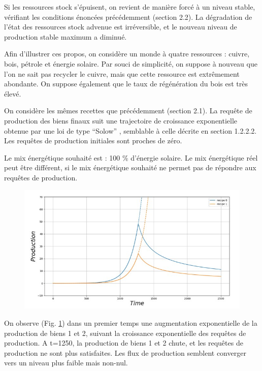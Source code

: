 \documentclass[12pt,a4paper]{article}%
\begin{document}
Si les ressources stock s'épuisent, on revient de manière forcé à un
niveau stable, vérifiant les conditions énoncées précédemment (section 2.2).
La dégradation de l'état des ressources stock advenue est irréversible, et le
nouveau niveau de production stable maximum a diminué.

Afin d'illustrer ces propos, on considère un monde à quatre ressources
: cuivre, bois, pétrole et énergie solaire. Par souci de simplicité, on
suppose à nouveau que l'on ne sait pas recycler le cuivre, mais que cette
ressource est extrêmement abondante. On suppose également que le taux de
régénération du bois est très élevé.

On considère les mêmes recettes que précédemment (section 2.1). La requête
de production des biens finaux suit une trajectoire de croissance
exponentielle obtenue par une loi de type "`Solow"' , semblable à celle
décrite en section 1.2.2.2. Les requêtes de production initiales sont proches
de zéro.

Le mix énergétique souhaité est : 100 \% d'énergie solaire. Le mix énergétique
réel peut être différent, si le mix énergétique souhaité ne permet pas de
répondre aux requêtes de production.

\begin{figure}[h]
\centering
\includegraphics[width=1.0\textwidth]{figures/Production11.jpg}\label{Fig11}\end{figure}

On observe (Fig. \ref{Fig11}) dans un premier temps une augmentation
exponentielle de la production de biens 1 et 2, suivant la croissance
exponentielle des requêtes de production. A t=1250, la production de biens 1
et 2 chute, et les requêtes de production ne sont plus satisfaites. Les flux
de production semblent converger vers un niveau plus faible mais non-nul.
\end{document}
